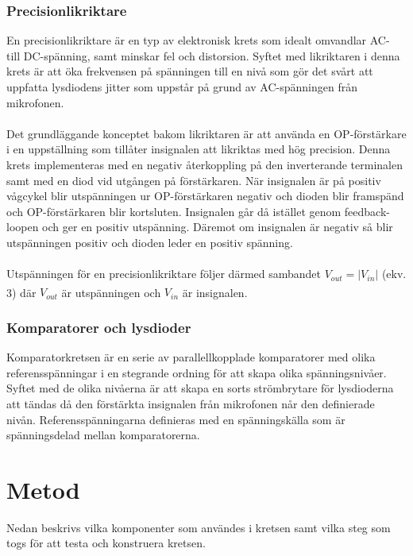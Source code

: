 \documentclass[12pt]{report}
\begin{document}
\subsection{Precisionlikriktare}
\label{subsec:rect}
En precisionlikriktare är en typ av elektronisk krets som idealt omvandlar AC- till DC-spänning, samt minskar fel och distorsion. Syftet med likriktaren i denna krets är att öka frekvensen på spänningen till en nivå som gör det svårt att uppfatta lysdiodens jitter som uppstår på grund av AC-spänningen från mikrofonen.
\\\\
Det grundläggande konceptet bakom likriktaren är att använda en OP-förstärkare i en uppställning som tillåter insignalen att likriktas med hög precision. Denna krets implementeras med en negativ återkoppling på den inverterande terminalen samt med en diod vid utgången på förstärkaren. När insignalen är på positiv vågcykel blir utspänningen ur OP-förstärkaren negativ och dioden blir framspänd och OP-förstärkaren blir kortsluten. Insignalen går då istället genom feedback-loopen och ger en positiv utspänning. Däremot om insignalen är negativ så blir utspänningen positiv och dioden leder en positiv spänning. 
\\\\
Utspänningen för en precisionlikriktare följer därmed sambandet $V_{out}=\left|V_{in}\right|$ \label{eq:rect}(ekv. 3) där $V_{out}$ är utspänningen och $V_{in}$ är insignalen.\textsuperscript{\cite{hambley}}


\subsection{Komparatorer och lysdioder}
\label{subsec:komp}
Komparatorkretsen är en serie av parallellkopplade komparatorer med olika referensspänningar i en stegrande ordning för att skapa olika spänningsnivåer. Syftet med de olika nivåerna är att skapa en sorts strömbrytare för lysdioderna att tändas då den förstärkta insignalen från mikrofonen når den definierade nivån. Referensspänningarna definieras med en spänningskälla som är spänningsdelad mellan komparatorerna.

\chapter{Metod}
\label{chap:method}
Nedan beskrivs vilka komponenter som användes i kretsen samt vilka steg som togs för att testa och konstruera kretsen.
\end{document}
